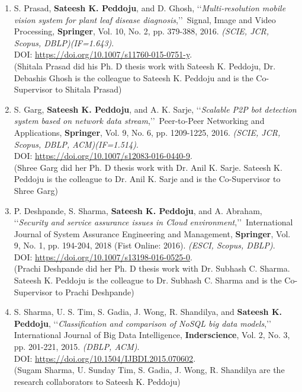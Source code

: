 \begin{enumerate}
	\item
	S. Prasad, \textbf{Sateesh K. Peddoju}, and D. Ghosh, \lq\lq \textit{Multi-resolution mobile vision system for plant leaf disease diagnosis},\rq\rq\, Signal, Image and Video Processing, \textbf{Springer}, Vol. 10, No. 2, pp. 379-388, 2016. \emph{(SCIE, JCR,  Scopus, DBLP)(IF=1.643)}. \\DOI: \url{https://doi.org/10.1007/s11760-015-0751-y}.  \\(Shitala Prasad did his Ph. D thesis work with Sateesh K. Peddoju, Dr. Debashis Ghosh is the colleague to Sateesh K. Peddoju and is the Co-Supervisor to Shitala Prasad)
	
	\item
	S. Garg, \textbf{Sateesh K. Peddoju}, and A. K. Sarje, \lq\lq \textit{Scalable P2P bot detection system based on network data stream},\rq\rq\, Peer-to-Peer Networking and Applications, \textbf{Springer}, Vol. 9, No. 6, pp. 1209-1225, 2016. \emph{(SCIE, JCR, Scopus, DBLP, ACM)(IF=1.514)}. \\DOI: \url{https://doi.org/10.1007/s12083-016-0440-9}. \\(Shree Garg did her Ph. D thesis work with Dr. Anil K. Sarje.  Sateesh K. Peddoju is the colleague to Dr. Anil K. Sarje and is the Co-Supervisor to Shree Garg)
	
	\item
	P. Deshpande, S. Sharma, \textbf{Sateesh K. Peddoju}, and A. Abraham, \lq\lq \textit{Security and service assurance issues in Cloud environment},\rq\rq\, International Journal of System Assurance Engineering and Management, \textbf{Springer}, Vol. 9, No. 1, pp. 194-204, 2018 (Fist Online: 2016). \emph{(ESCI, Scopus, DBLP)}. \\DOI: \url{https://doi.org/10.1007/s13198-016-0525-0}.  \\(Prachi Deshpande did her Ph. D thesis work with Dr. Subhash C. Sharma. Sateesh K. Peddoju is the colleague to Dr. Subhash C. Sharma and is the Co-Supervisor to Prachi Deshpande)
	
	\item
	S. Sharma, U. S. Tim, S. Gadia, J. Wong, R. Shandilya, and \textbf{Sateesh K. Peddoju}, \lq\lq \textit{Classification and comparison of NoSQL big data models},\rq\rq\, International Journal of Big Data Intelligence, \textbf{Inderscience}, Vol. 2, No. 3, pp. 201-221, 2015. \emph{(DBLP, ACM)}. \\DOI: \url{https://doi.org/10.1504/IJBDI.2015.070602}.
\\(Sugam Sharma, U. Sunday Tim, S. Gadia, J. Wong, R. Shandilya are the research collaborators to Sateesh K. Peddoju)	
	

\end{enumerate}

